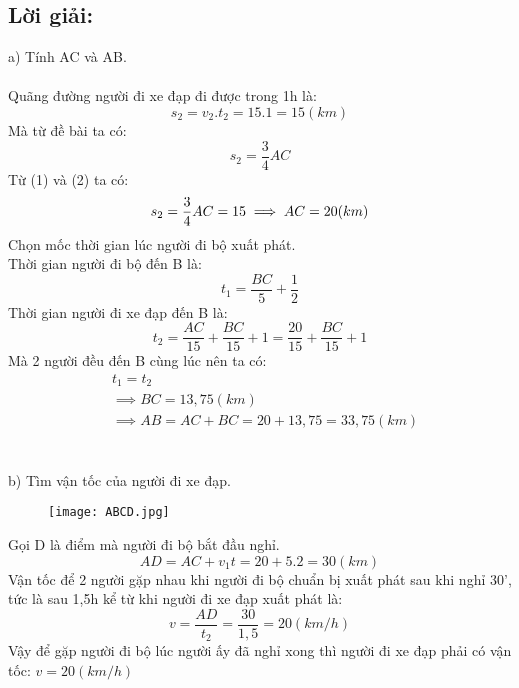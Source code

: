 \documentclass[50pt]{article}
\begin{document}
\subsection*{\color[HTML]{4287f5}Lời giải:}
a) Tính AC và AB.\\
\\
Quãng đường người đi xe đạp đi được trong 1h là:\\
\begin{equation}
    s_{2} = v_{2}.t_{2} = 15.1 = 15 (km)
\end{equation}
Mà từ đề bài ta có:\\
\begin{equation}
    s_{2} = \dfrac{3}{4}AC
\end{equation}
Từ (1) và (2) ta có:
\begin{equation*}
    s_{2} = \dfrac{3}{4}AC = 15 \\
    \implies AC = 20 (km)
\end{equation*}
Chọn mốc thời gian lúc người đi bộ xuất phát.\\
Thời gian người đi bộ đến B là:
\begin{equation*}
    t_{1} = \dfrac{BC}{5} + \dfrac{1}{2}
\end{equation*}
Thời gian người đi xe đạp đến B là:
\begin{equation*}
    t_{2} = \dfrac{AC}{15} + \dfrac{BC}{15} + 1 = \dfrac{20}{15} + \dfrac{BC}{15} + 1
\end{equation*}
Mà 2 người đều đến B cùng lúc nên ta có: \\
\begin{equation*}
    \begin{aligned}
        & t_{1} = t_{2} \\
        & \implies BC = 13,75 (km) \\
        & \implies AB = AC + BC = 20 + 13,75 = 33,75 (km)
    \end{aligned}
\end{equation*}
\\
\\
b) Tìm vận tốc của người đi xe đạp.\\
\begin{figure}[H]
    \centering
    \texttt{[image: ABCD.jpg]}
    \label{fig:enter-label}
\end{figure}
\noindent Gọi D là điểm mà người đi bộ bắt đầu nghỉ.\\
\begin{equation*}
    AD = AC + v_{1}t = 20 + 5.2 = 30 (km)
\end{equation*}
Vận tốc để  2 người gặp nhau khi người đi bộ chuẩn bị xuất phát sau khi nghỉ 30', tức là sau 1,5h kể từ khi người đi xe đạp xuất phát là:\\
\begin{equation*}
    v = \dfrac{AD}{t_{2}} = \dfrac{30}{1,5} = 20 (km/h)
\end{equation*}
Vậy để gặp người đi bộ lúc người ấy đã nghỉ xong thì người đi xe đạp phải có vận tốc: $v = 20 (km/h)$
\end{document}
